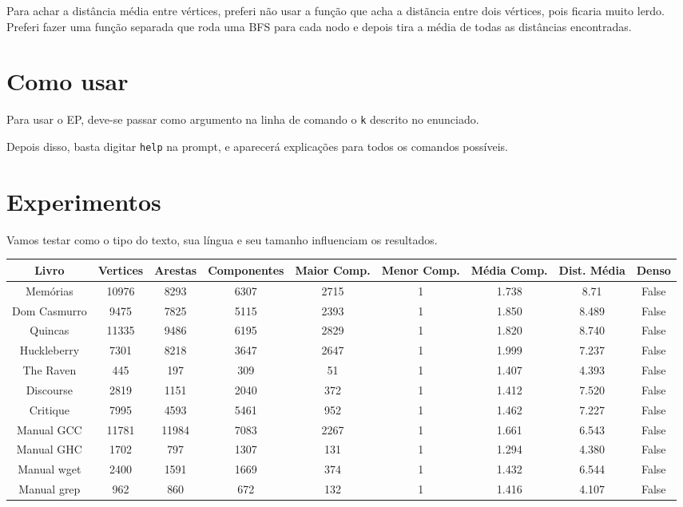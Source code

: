 \documentclass[12pt]{article}
\begin{document}
Para achar a distância média entre vértices, preferi não usar a função que acha a distãncia entre dois vértices, pois ficaria muito lerdo. Preferi fazer uma função separada que roda uma BFS para cada nodo e depois tira a média de todas as distâncias encontradas.

\section{Como usar}

Para usar o EP, deve-se passar como argumento na linha de comando o \texttt{k} descrito no enunciado.

Depois disso, basta digitar \texttt{help} na prompt, e aparecerá explicações para todos os comandos possíveis.

\newpage

\section{Experimentos}

Vamos testar como o tipo do texto, sua língua e seu tamanho influenciam os resultados.

\begin{center}
  \begin{tabular}{||c | c | c | c | c | c | c | c | c||} 
    \hline
    Livro & Vertices & Arestas & Componentes & Maior Comp. & Menor Comp. & Média Comp. & Dist. Média & Denso \\ [0.5ex] 
    \hline\hline
    Memórias & 10976 & 8293 & 6307 & 2715 & 1 & 1.738 & 8.71 & False \\
    \hline
    Dom Casmurro & 9475 & 7825 & 5115 & 2393 & 1 & 1.850 & 8.489 & False \\ 
    \hline
    Quincas & 11335 & 9486 & 6195 & 2829 & 1 & 1.820 & 8.740 & False \\ 
    \hline
    Huckleberry & 7301 & 8218 & 3647 & 2647 & 1 & 1.999 & 7.237 & False \\ 
    \hline
    The Raven & 445 & 197 & 309 & 51 & 1 & 1.407 & 4.393 & False \\ 
    \hline
    Discourse & 2819 & 1151 & 2040 & 372 & 1 & 1.412 & 7.520 & False \\ 
    \hline
    Critique & 7995 & 4593 & 5461 & 952 & 1 & 1.462 & 7.227 & False \\ 
    \hline
    Manual GCC & 11781 & 11984 & 7083 & 2267 & 1 & 1.661 & 6.543 & False \\ 
    \hline
    Manual GHC & 1702 & 797 & 1307 & 131 & 1 & 1.294 & 4.380 & False \\ 
    \hline
    Manual wget & 2400 & 1591 & 1669 & 374 & 1 & 1.432 & 6.544 & False \\ 
    \hline
    Manual grep & 962 & 860 & 672 & 132 & 1 & 1.416 & 4.107 & False \\ [1ex]
    \hline
    \hline
  \end{tabular}
\end{center}
\end{document}
